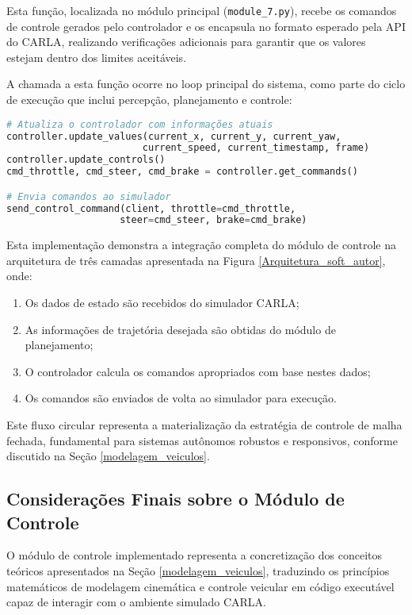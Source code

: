 Esta função, localizada no módulo principal (\texttt{module\_7.py}), recebe os comandos de controle gerados pelo controlador e os encapsula no formato esperado pela API do CARLA, realizando verificações adicionais para garantir que os valores estejam dentro dos limites aceitáveis.

A chamada a esta função ocorre no loop principal do sistema, como parte do ciclo de execução que inclui percepção, planejamento e controle:

\begin{lstlisting}[language=Python, caption=Ciclo principal do sistema com atualização do controlador., label=lst:main-loop]
# Atualiza o controlador com informações atuais
controller.update_values(current_x, current_y, current_yaw,
                        current_speed, current_timestamp, frame)
controller.update_controls()
cmd_throttle, cmd_steer, cmd_brake = controller.get_commands()

# Envia comandos ao simulador
send_control_command(client, throttle=cmd_throttle, 
                    steer=cmd_steer, brake=cmd_brake)
\end{lstlisting}

Esta implementação demonstra a integração completa do módulo de controle na arquitetura de três camadas apresentada na Figura \ref{Arquitetura_soft_autor}, onde:

\begin{enumerate}
    \item Os dados de estado são recebidos do simulador CARLA;
    \item As informações de trajetória desejada são obtidas do módulo de planejamento;
    \item O controlador calcula os comandos apropriados com base nestes dados;
    \item Os comandos são enviados de volta ao simulador para execução.
\end{enumerate}

Este fluxo circular representa a materialização da estratégia de controle de malha fechada, fundamental para sistemas autônomos robustos e responsivos, conforme discutido na Seção \ref{modelagem_veiculos}.

\subsection{Considerações Finais sobre o Módulo de Controle}

O módulo de controle implementado representa a concretização dos conceitos teóricos apresentados na Seção \ref{modelagem_veiculos}, traduzindo os princípios matemáticos de modelagem cinemática e controle veicular em código executável capaz de interagir com o ambiente simulado CARLA.

